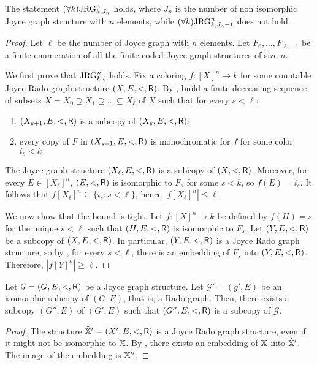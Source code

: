 \begin{corollary}[$\ACA_0$]
  The statement $(\forall k) \mathrm{JRG}^n_{k,J_n}$ holds, where $J_n$ is the number of non isomorphic Joyce graph structure with $n$ elements, while $(\forall k)\mathrm{JRG}^n_{k,J_n-1}$ does not hold.
\end{corollary}
\begin{proof}
Let $\ell$ be the number of Joyce graph with $n$ elements. Let $F_0, \dots, F_{\ell-1}$ be a finite enumeration of all the finite coded Joyce graph structures of size $n$.

We first prove that $\mathrm{JRG}^n_{k, \ell}$ holds.
Fix a coloring $f: [X]^n \to k$ for some countable Joyce Rado graph structure $(X, E, <, \mathsf{R})$. By , build a finite decreasing sequence of subsets $X = X_0 \supseteq X_1 \supseteq \dots \subseteq X_\ell$ of $X$ such that for every $s < \ell$:
\begin{enumerate}
	\item $(X_{s+1},  E, <, \mathsf{R})$ is a subcopy of $(X_s, E, <, \mathsf{R})$;
	\item every copy of $F$ in $(X_{s+1},  E, <, \mathsf{R})$ is monochromatic for $f$ for some color $i_s < k$
\end{enumerate}
The Joyce graph structure $(X_\ell, E, <, \mathsf{R})$ is a subcopy of $(X, <, \mathsf{R})$.
Moreover, for every $E \in [X_\ell]^n$, $(E, <, \mathsf{R})$ is isomorphic to $F_s$ for some $s < k$,
so $f(E) = i_s$. It follows that $f[X_\ell]^n \subseteq \{ i_s: s < \ell \}$, hence $|f[X_\ell]^n| \leq \ell$.

We now show that the bound is tight. Let $f: [X]^n \to k$ be defined by $f(H) = s$ for the unique $s < \ell$ such that $(H, E, <, \mathsf{R})$ is isomorphic to $F_s$. 
Let $(Y, E, <, \mathsf{R})$ be a subcopy of $(X, E, <, \mathsf{R})$. In particular, $(Y, E, <, \mathsf{R})$ is a Joyce Rado graph structure, so by , for every $s < \ell$, there is an embedding of $F_s$ into $(Y, E, <, \mathsf{R})$. Therefore, $|f[Y]^n| \geq \ell$.
\end{proof}


\begin{theorem}[$\ACA_0$]\label{thm:subgraph-to-subjoyce-Rado}
  Let $\mathcal{G}=(G,E,<,\mathsf{R})$ be a Joyce graph structure. Let $\mathcal{G}'=(g',E)$ be an isomorphic subcopy of $(G,E)$, that is, a Rado graph. Then, there exists a subcopy $(G'',E)$ of $(G',E)$ such that $(G'',E,<,\mathsf{R})$ is a subcopy of $\mathcal{G}$.
\end{theorem}
\begin{proof}
  The structure $\hat{\mathbb{X}}'=(X',E, <,\mathsf{R})$ is a Joyce Rado graph structure, even if it might not be isomorphic to $\mathbb{X}$. By , there exists an embedding of $\mathbb{X}$ into $\hat{\mathbb{X}}'$. The image of the embedding is $\mathbb{X}''$.
\end{proof}

